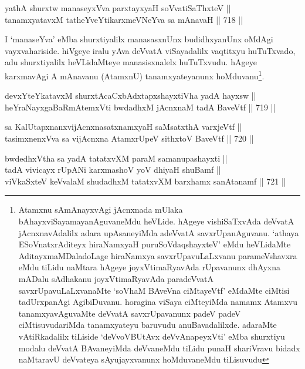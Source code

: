 \begin{shl}
yathA shurxtw manaseyxVva parxtayxyaH soV\s vatiSaThxteV ||  \\
tanamxyatavxM tatheYveYtikarxmeVNeYva sa mAnavaH \hfill || 718 ||  
\end{shl}

\begin{artha} 
I `manaseYva' eMba shurxtiyalilx manasasxnUnx budidhxyanUnx oMdAgi vayxvahariside. hiVgeye iralu yAva deVvatA viSayadalilx vaqtitxyu huTuTxvado, adu shurxtiyalilx heVLidaMteye manasisxnalelx huTuTxvudu. hAgeye karxmavAgi A mAnavanu (AtamxnU) tanamxyateyanunx hoMduvanu\footnote{Atamxnu sAmAnayxvAgi jAcnxnada mUlaka bAhayxviSayamayanAguvaneMdu heVLide. hAgeye vishiSaTxvAda deVvatA jAcnxnavAdalilx adara upAsaneyiMda adeVvatA savxrUpanAguvanu. `athaya ESoV\s natxrAditeyx hiraNamxyaH puruSoVdaqshayxteV' eMdu heVLidaMte AditayxmaMDaladoLage hiraNamxya savxrUpavuLaLxvanu parameVshavxra eMdu tiLidu naMtara hAgeye joyxVtimaRyavAda rUpavanunx dhAyxna mADalu sAdhakanu joyxVtimaRyavAda paradeVvatA savxrUpavuLaLxvanaMte `soVhaM BAveVna ciMtayeVtf' eMdaMte ciMtisi tadUrxpanAgi AgibiDuvanu. horagina viSaya ciMteyiMda namamx Atamxvu tanamxyavAguvaMte deVvatA savxrUpavanunx padeV padeV ciMtisuvudariMda tanamxyateyu baruvudu anuBavadalilxde. adaraMte vAtiRkadalilx tiLiside \ndash  `deVvoVBUtAvx deVvAnapeyxVti' eMba shurxtiyu modalu deVvatA BAvaneyiMda deVvaneMdu tiLidu punaH shariVravu bidadx naMtaravU deVvateya sAyujayxvanunx hoMduvaneMdu tiLisuvudu}.
\end{artha}


\begin{shl}
devxYteYkatavxM shurxtAcaCxbAdxtapxshayxtiVha yadA hayxsw || \\
heYraNayxgaBaRmAtemxVti bwdadhxM jAcnxnaM tadA BaveVtf \hfill || 719 ||  
\end{shl}
				
\begin{shl}
sa KalUtapxnanxvijAcnxnasatxnamxyaH saMsatxthA varxjeVtf || \\
tasimxnenxVva sa vijAcnxna AtamxrUpeV sithxtoV BaveVtf \hfill || 720 ||  
\end{shl}
				
\begin{shl}
bwdedhxV\s tha sa yadA tatatxvXM paraM samanupashayxti || \\
tadA vivicayx rUpANi karxmashoV yoV dhiyaH shuBamf || \\
viVkaSxteV keVvalaM shudadhxM tatatxvXM barxhamx sanAtanamf \hfill || 721 ||  
\end{shl}

